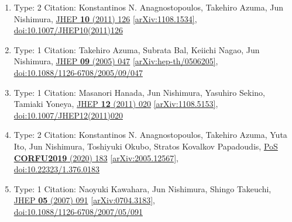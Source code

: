 \documentclass[a4paper,10pt]{article}
\begin{document}
\begin{enumerate}
\begin{enumerate}
  \item Type: 2 Citation: Konstantinos N. Anagnostopoulos, Takehiro Azuma, Jun Nishimura, \href{https://www.doi.org/10.1007/JHEP10(2011)126}{JHEP {\bf 10} (2011) 126}  \href{https://arxiv.org/abs/1108.1534}{[arXiv:1108.1534]},\\\href{https://www.doi.org/10.1007/JHEP10(2011)126}{doi:10.1007/JHEP10(2011)126}
  \item Type: 1 Citation: Takehiro Azuma, Subrata Bal, Keiichi Nagao, Jun Nishimura, \href{https://www.doi.org/10.1088/1126-6708/2005/09/047}{JHEP {\bf 09} (2005) 047}  \href{https://arxiv.org/abs/hep-th/0506205}{[arXiv:hep-th/0506205]},\\\href{https://www.doi.org/10.1088/1126-6708/2005/09/047}{doi:10.1088/1126-6708/2005/09/047}
  \item Type: 1 Citation: Masanori Hanada, Jun Nishimura, Yasuhiro Sekino, Tamiaki Yoneya, \href{https://www.doi.org/10.1007/JHEP12(2011)020}{JHEP {\bf 12} (2011) 020}  \href{https://arxiv.org/abs/1108.5153}{[arXiv:1108.5153]},\\\href{https://www.doi.org/10.1007/JHEP12(2011)020}{doi:10.1007/JHEP12(2011)020}
  \item Type: 2 Citation: Konstantinos N. Anagnostopoulos, Takehiro Azuma, Yuta Ito, Jun Nishimura, Toshiyuki Okubo, Stratos Kovalkov Papadoudis, \href{https://www.doi.org/10.22323/1.376.0183}{PoS {\bf CORFU2019} (2020) 183}  \href{https://arxiv.org/abs/2005.12567}{[arXiv:2005.12567]},\\\href{https://www.doi.org/10.22323/1.376.0183}{doi:10.22323/1.376.0183}
  \item Type: 1 Citation: Naoyuki Kawahara, Jun Nishimura, Shingo Takeuchi, \href{https://www.doi.org/10.1088/1126-6708/2007/05/091}{JHEP {\bf 05} (2007) 091}  \href{https://arxiv.org/abs/0704.3183}{[arXiv:0704.3183]},\\\href{https://www.doi.org/10.1088/1126-6708/2007/05/091}{doi:10.1088/1126-6708/2007/05/091}

\end{enumerate}
\end{enumerate}
\end{document}
